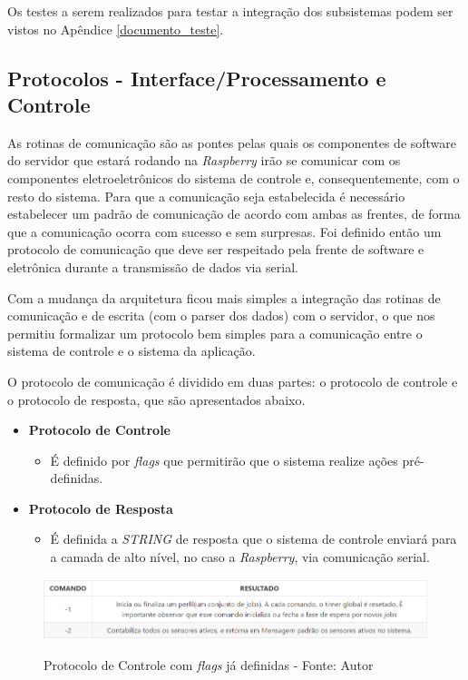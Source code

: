 Os testes a serem realizados para testar a integração dos subsistemas podem ser vistos no Apêndice \ref{documento_teste}.

\subsection*{\textbf{Protocolos - Interface/Processamento e Controle}} \label{software:protocolo}

As rotinas de comunicação são as pontes pelas quais os componentes de software do servidor que estará rodando na \textit{Raspberry} irão se
comunicar com os componentes eletroeletrônicos do sistema de controle e, consequentemente, com o resto do sistema. 
Para que a comunicação seja estabelecida é necessário estabelecer um padrão de comunicação de acordo com ambas as frentes, de forma que a comunicação 
ocorra com sucesso e sem surpresas. Foi definido então um protocolo de comunicação que deve ser respeitado pela frente de software e
eletrônica durante a transmissão de dados via serial.

Com a mudança da arquitetura ficou mais simples a integração das rotinas de comunicação e de escrita (com o parser dos dados)
com o
servidor, o que nos permitiu formalizar um protocolo bem simples para a comunicação entre o sistema de controle e o 
sistema da aplicação.

O protocolo de comunicação é dividido em duas partes: o protocolo de controle e o protocolo de resposta, que são apresentados 
abaixo.

\begin{itemize}
    \item \textbf{Protocolo de Controle}
    \begin{itemize}
        \item É definido por \textit{flags} que permitirão que o sistema realize ações pré-definidas.
    \end{itemize}
    \item \textbf{Protocolo de Resposta}
    \begin{itemize}
        \item É definida a \textit{STRING} de resposta que o sistema de controle enviará para a camada de alto nível, no caso a \textit{Raspberry}, via 
        comunicação serial.
    \end{itemize}
\end{itemize}

\begin{figure}[H]
\centering
\includegraphics[keepaspectratio=true,scale=0.7]{figuras/protocolo_controle.png}
\label{fig:protocolo_controle}
\caption{Protocolo de Controle com \textit{flags} já definidas - Fonte: Autor}
\end{figure}

